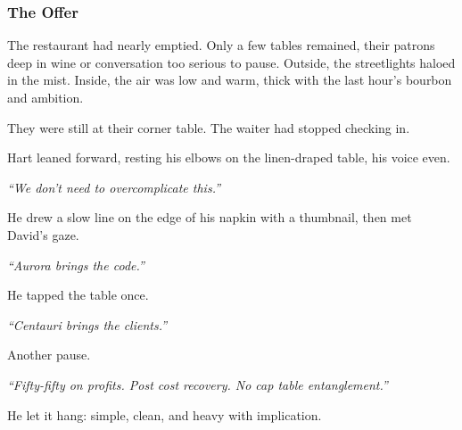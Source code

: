 \medskip

\subsubsection{The Offer}

The restaurant had nearly emptied. Only a few tables remained, their patrons deep in wine or conversation too serious to pause. 
Outside, the streetlights haloed in the mist. Inside, the air was low and warm, thick with the last hour’s bourbon and ambition.

They were still at their corner table. The waiter had stopped checking in.

Hart leaned forward, resting his elbows on the linen-draped table, his voice even.

\textit{``We don’t need to overcomplicate this.''}

He drew a slow line on the edge of his napkin with a thumbnail, then met David’s gaze.

\textit{``Aurora brings the code.''}

He tapped the table once.

\textit{``Centauri brings the clients.''}

Another pause.

\textit{``Fifty-fifty on profits. Post cost recovery. No cap table entanglement.''}

He let it hang: simple, clean, and heavy with implication.

\medskip

